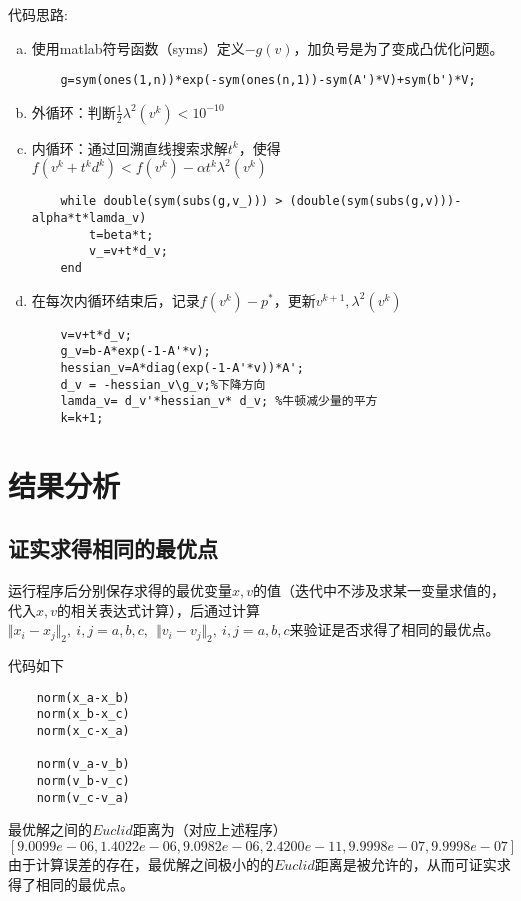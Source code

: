 \documentclass{article}
\begin{document}
代码思路:
\begin{enumerate}[a)]
    \item 使用matlab符号函数（syms）定义$-g(v)$，加负号是为了变成凸优化问题。
    \begin{lstlisting}
    g=sym(ones(1,n))*exp(-sym(ones(n,1))-sym(A')*V)+sym(b')*V; 
    \end{lstlisting}
    \item 外循环：判断$\frac{1}{2}\lambda^2(v^k)<10^{-10}$
    \item 内循环：通过回溯直线搜索求解$t^k$，使得$f(v^k+t^kd^k)<f(v^k)-\alpha t^k \lambda^2(v^k)$
    \begin{lstlisting}
    while double(sym(subs(g,v_))) > (double(sym(subs(g,v)))-alpha*t*lamda_v)
        t=beta*t;
        v_=v+t*d_v;
    end
    \end{lstlisting}
    \item 在每次内循环结束后，记录$f(v^k)-p^\ast$，更新$v^{k+1},\lambda^2(v^k)$
    \begin{lstlisting}
    v=v+t*d_v;
    g_v=b-A*exp(-1-A'*v);
    hessian_v=A*diag(exp(-1-A'*v))*A';
    d_v = -hessian_v\g_v;%下降方向
    lamda_v= d_v'*hessian_v* d_v; %牛顿减少量的平方
    k=k+1;
    \end{lstlisting}
\end{enumerate}

\section{结果分析}
\subsection{证实求得相同的最优点}
运行程序后分别保存求得的最优变量$x,v$的值（迭代中不涉及求某一变量求值的，代入$x,v$的相关表达式计算），后通过计算$\Vert x_i -x_j \Vert_2,\ i,j=a,b,c,\ \ \Vert v_i -v_j \Vert_2,\ i,j=a,b,c$来验证是否求得了相同的最优点。

代码如下
\begin{lstlisting}
    norm(x_a-x_b)
    norm(x_b-x_c)
    norm(x_c-x_a)

    norm(v_a-v_b)
    norm(v_b-v_c)
    norm(v_c-v_a)
\end{lstlisting}
最优解之间的$Euclid$距离为（对应上述程序）\\
$[9.0099e-06,
1.4022e-06,
9.0982e-06,
2.4200e-11,
9.9998e-07,
9.9998e-07]$\\
由于计算误差的存在，最优解之间极小的的$Euclid$距离是被允许的，从而可证实求得了相同的最优点。
\end{document}
